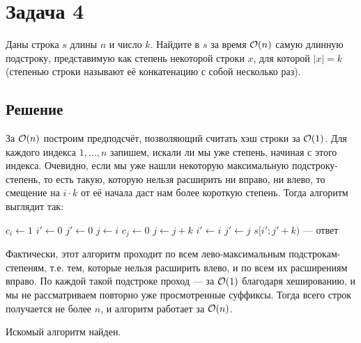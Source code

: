 \section{Задача 4}
Даны строка $s$ длины $n$ и число $k$. Найдите в $s$ за время $\mathcal{O}(n)$ самую длинную подстроку,
представимую как степень  некоторой строки $x$, для которой $|x| = k$ (степенью строки
называют её конкатенацию с собой несколько раз).

\subsection{Решение}
За $\mathcal{O}(n)$ построим предподсчёт, позволяющий считать хэш строки за $\mathcal{O}(1)$.
Для каждого индекса $1,\ldots,n$ запишем, искали ли мы уже степень, начиная с этого индекса.
Очевидно, если мы уже нашли некоторую максимальную подстроку-степень,
то есть такую, которую нельзя расширить ни вправо, ни влево,
то смещение на $i \cdot k$ от её начала
даст нам более короткую степень.
Тогда алгоритм выглядит так:

\noindent
\begin{minipage}{\hsize}
\begin{algorithmic}
        \State $c_i \gets 1$
    \EndFor
    \State $i' \gets 0$
    \State $j' \gets 0$
        \State $j \gets i$
        \While{$(c_j = 1) \land (j + k < n) \land (s[i ; i + k) = s[j ; j + k))$}
            \State $c_j \gets 0$
            \State $j \gets j + k$
        \EndWhile
            \State $i' \gets i$
            \State $j' \gets j$
        \EndIf
    \EndFor
    \State $s[i'; j' + k)$ --- ответ
\end{algorithmic}
\end{minipage}

Фактически, этот алгоритм проходит по всем
лево-максимальным подстрокам-степеням,
т.е. тем, которые нельзя расширить влево,
и по всем их расширениям вправо.
По каждой такой подстроке проход --- за $\mathcal{O}(1)$ благодаря хешированию,
и мы не рассматриваем повторно уже просмотренные суффиксы.
Тогда всего строк получается не более $n$,
и алгоритм работает за $\mathcal{O}(n)$.

Искомый алгоритм найден.
